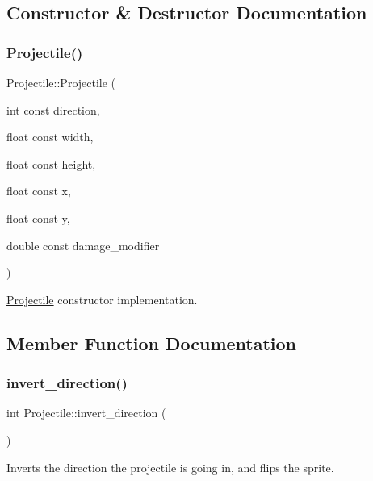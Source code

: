 \subsection{Constructor \& Destructor Documentation}
\mbox{\label{classProjectile_a2405b8d7efa8c98ca978e31aa76c48b3}} 
\subsubsection{\texorpdfstring{Projectile()}{Projectile()}}
{\footnotesize\ttfamily Projectile\+::\+Projectile (\begin{DoxyParamCaption}\item[{int const}]{direction,  }\item[{float const}]{width,  }\item[{float const}]{height,  }\item[{float const}]{x,  }\item[{float const}]{y,  }\item[{double const}]{damage\+\_\+modifier }\end{DoxyParamCaption})}

\hyperlink{classProjectile}{Projectile} constructor implementation. 

\subsection{Member Function Documentation}
\mbox{\label{classProjectile_a90a5fdd713db14b83732d9cfc9a0479e}} 
\subsubsection{\texorpdfstring{invert\+\_\+direction()}{invert\_direction()}}
{\footnotesize\ttfamily int Projectile\+::invert\+\_\+direction (\begin{DoxyParamCaption}{ }\end{DoxyParamCaption})}

Inverts the direction the projectile is going in, and flips the sprite. \mbox{\label{classProjectile_aa503768163cf6144328203f56d3866c1}} 
